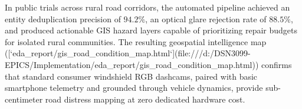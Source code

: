 In public trials across rural road corridors, the automated pipeline achieved an entity deduplication precision of $94.2\%$, an optical glare rejection rate of $88.5\%$, and produced actionable GIS hazard layers capable of prioritizing repair budgets for isolated rural communities. The resulting geospatial intelligence map ([`eda_report/gis_road_condition_map.html`](file:///d:/DSN3099-EPICS/Implementation/eda_report/gis_road_condition_map.html)) confirms that standard consumer windshield RGB dashcams, paired with basic smartphone telemetry and grounded through vehicle dynamics, provide sub-centimeter road distress mapping at zero dedicated hardware cost.
